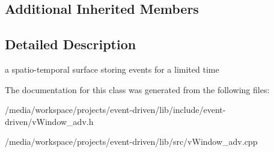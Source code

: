 \subsection*{Additional Inherited Members}


\subsection{Detailed Description}
a spatio-\/temporal surface storing events for a limited time 

The documentation for this class was generated from the following files\+:\begin{DoxyCompactItemize}
\item 
/media/workspace/projects/event-\/driven/lib/include/event-\/driven/v\+Window\+\_\+adv.\+h\item 
/media/workspace/projects/event-\/driven/lib/src/v\+Window\+\_\+adv.\+cpp\end{DoxyCompactItemize}
